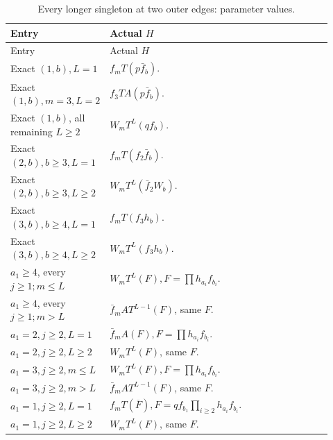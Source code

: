 \begingroup\small
\setlength{\tabcolsep}{3pt}
\setlength{\LTleft}{0pt}\setlength{\LTright}{\fill}
\begin{longtable}{@{}p{0.2200\linewidth}p{0.7000\linewidth}@{}}
\caption{Every longer singleton at two outer edges: parameter values.}\label{tab:parameters:r2-c048:1}\\
\toprule
Entry & Actual \(H\) \\
\midrule\endfirsthead
\toprule
Entry & Actual \(H\) \\
\midrule\endhead
\bottomrule\endfoot
Exact \((1,\allowbreak \allowbreak b),\allowbreak \allowbreak  L=1\) & \(f_m T(p \bar f_b)\). \\
\addlinespace[2pt]
Exact \((1,\allowbreak \allowbreak b),\allowbreak \allowbreak  m=3,\allowbreak \allowbreak L=2\) & \(f_{3} T A(p \bar f_b)\). \\
\addlinespace[2pt]
Exact \((1,\allowbreak \allowbreak b)\), all remaining \(L\ge 2\) & \(W_m T^L(q f_b)\). \\
\addlinespace[2pt]
Exact \((2,\allowbreak \allowbreak b),\allowbreak \allowbreak  b\ge 3,\allowbreak \allowbreak L=1\) & \(f_m T(f_{2} \bar f_b)\). \\
\addlinespace[2pt]
Exact \((2,\allowbreak \allowbreak b),\allowbreak \allowbreak  b\ge 3,\allowbreak \allowbreak L\ge 2\) & \(W_m T^L(\bar f_{2} W_b)\). \\
\addlinespace[2pt]
Exact \((3,\allowbreak \allowbreak b),\allowbreak \allowbreak  b\ge 4,\allowbreak \allowbreak L=1\) & \(f_m T(f_{3} h_b)\). \\
\addlinespace[2pt]
Exact \((3,\allowbreak \allowbreak b),\allowbreak \allowbreak  b\ge 4,\allowbreak \allowbreak L\ge 2\) & \(W_m T^L(f_{3} h_b)\). \\
\addlinespace[2pt]
\(a_{1}\ge 4\), every \(j\ge 1; m\le L\) & \(W_m T^L(F),\allowbreak \allowbreak  F=\prod h_{a_{i}} f_{b_{i}}\). \\
\addlinespace[2pt]
\(a_{1}\ge 4\), every \(j\ge 1; m>L\) & \(\bar f_m A T^{L-1}(F)\), same \(F\). \\
\addlinespace[2pt]
\(a_{1}=2,\allowbreak \allowbreak j\ge 2,\allowbreak \allowbreak L=1\) & \(\bar f_m A(F),\allowbreak \allowbreak  F=\prod h_{a_{i}} f_{b_{i}}\). \\
\addlinespace[2pt]
\(a_{1}=2,\allowbreak \allowbreak j\ge 2,\allowbreak \allowbreak L\ge 2\) & \(W_m T^L(F)\), same \(F\). \\
\addlinespace[2pt]
\(a_{1}=3,\allowbreak \allowbreak j\ge 2,\allowbreak \allowbreak m\le L\) & \(W_m T^L(F),\allowbreak \allowbreak  F=\prod h_{a_{i}} f_{b_{i}}\). \\
\addlinespace[2pt]
\(a_{1}=3,\allowbreak \allowbreak j\ge 2,\allowbreak \allowbreak m>L\) & \(\bar f_m A T^{L-1}(F)\), same \(F\). \\
\addlinespace[2pt]
\(a_{1}=1,\allowbreak \allowbreak j\ge 2,\allowbreak \allowbreak L=1\) & \(f_m T(\overline F),\allowbreak \allowbreak F=q f_{b_{1}}\prod_{i\ge2}h_{a_{i}}f_{b_{i}}\). \\
\addlinespace[2pt]
\(a_{1}=1,\allowbreak \allowbreak j\ge 2,\allowbreak \allowbreak L\ge 2\) & \(W_m T^L(F)\), same \(F\). \\
\end{longtable}
\endgroup


